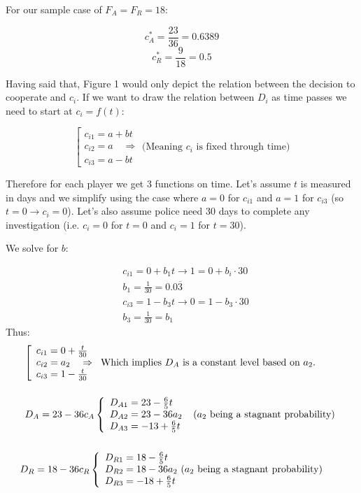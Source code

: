 \documentclass[11pt, a4paper]{article}
\begin{document}
For our sample case of $F_A = F_R = 18$:
\begin{center}
    $$c_A^* = \frac{23}{36} = 0.6389$$
    $$c_R^* = \frac{9}{18} = 0.5$$
\end{center}

Having said that, Figure 1 would only depict the relation between the decision to cooperate and $c_i$. If we want to draw the relation between $D_i$ as time passes we need to start at $c_i = f(t)$:

$$
{\left[\begin{array}{l}
c_{i 1}= a + bt \\
c_{i 2}= a \quad \Rightarrow \\
c_{i 3}= a - bt
\end{array} \text {(Meaning } c_i \text { is fixed through time)}\right.} 
$$

Therefore for each player we get 3 functions on time. Let's assume $t$ is measured in days and we simplify using the case where $a = 0$ for $c_{i1}$ and $a = 1$ for $c_{i3}$ (so $t = 0 \rightarrow c_i = 0$). Let's also assume police need 30 days to complete any investigation (i.e. $c_i = 0$ for $t = 0$ and $c_i = 1$ for $t = 30$).

We solve for $b$:

$$
\begin{aligned}
& c_{i 1}=0+b_1 t \rightarrow 1=0+b_i \cdot 30 \\
& b_1=\frac{1}{30}=0.0\overline{3} \\
& c_{i 3}=1-b_3 t \rightarrow 0=1-b_3 \cdot 30 \\
& b_3=\frac{1}{30}=b_1
\end{aligned}
$$
Thus:
$$
\begin{aligned}
& \begin{array}{l}
{\left[\begin{array}{l}
c_{i 1}=0+\frac{t}{30} \\
c_{i 2}=a_2 \quad \Rightarrow \\
c_{i 3}=1-\frac{t}{30} 
\end{array}  \text { Which implies } D_A \text { is a constant level based on } a_2 .\right.} \\ 
\vspace{5pt} \\
D_A=23-36 c_A\left\{\begin{array}{l}
D_{A 1}=23-\frac{6}{5} t \\
D_{A 2}=23-36 a_2 \\
D_{A 3}=-13+\frac{6}{5} t
\end{array}\right. \text { ($a_2$ being a stagnant probability) }
\end{array} \\
\vspace{5pt} \\
& D_R=18-36 c_R\left\{\begin{array}{l}
D_{R 1}=18-\frac{6}{5} t \\
D_{R 2}=18-36 a_2 \text { ($a_2$ being a stagnant probability) } \\
D_{R 3}=-18+\frac{6}{5} t
\end{array}\right.
\end{aligned}
$$
\end{document}
